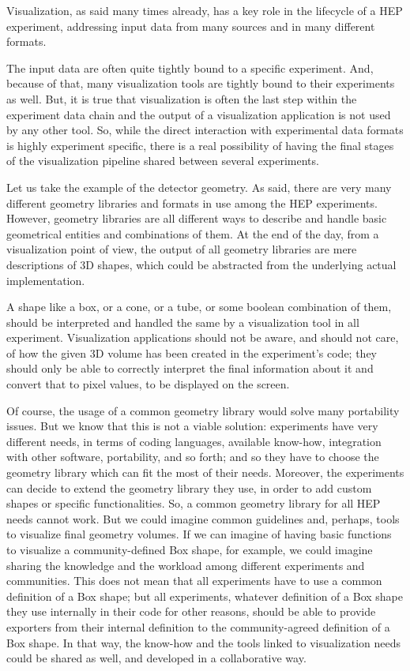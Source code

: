 \documentclass[12pt,a4paper]{article}
\begin{document}
Visualization, as said many times already, has a key role in the lifecycle of a HEP experiment, addressing input data from many sources and in many different formats.

The input data are often quite tightly bound to a specific experiment. And, because of that, many visualization tools are tightly bound to their experiments as well. But, it is true that visualization is often the last step within the experiment data chain and the output of a visualization application is not used by any other tool. So, while the direct interaction with experimental data formats is highly experiment specific, there is a real possibility of having the final stages of the visualization pipeline shared between several experiments.

Let us take the example of the detector geometry. As said, there are very many different geometry libraries and formats in use among the HEP experiments. However, geometry libraries are all different ways to describe and handle basic  geometrical entities and combinations of them. At the end of the day, from a visualization point of view, the output of all geometry libraries are mere descriptions of 3D shapes, which  could be abstracted from the underlying actual implementation.

A shape like a box, or a cone, or a tube, or some boolean combination of them, should be interpreted and handled the same by a visualization tool in all experiment. Visualization applications should not be aware, and should not care, of how  the given 3D volume has been created in the experiment’s code; they should only be able to correctly interpret the final information about it and convert that to pixel values, to be displayed on the screen.

Of course, the usage of a common geometry library would solve many portability issues. But we know that this is not a viable solution: experiments have very different needs, in terms of coding languages, available know-how, integration with other software, portability, and so forth; and so they have to choose the geometry library which can fit the most of their needs.
Moreover, the experiments can decide to extend the geometry library they use, in order to add custom shapes or specific functionalities. So, a common geometry library for all HEP needs cannot work.
But we could imagine common guidelines and, perhaps, tools to visualize final geometry volumes. If we can imagine of having basic functions to visualize a community-defined Box shape, for example, we could imagine sharing the knowledge and the workload among different experiments and communities. This does not mean that all experiments have to use a common definition
of a Box shape; but all experiments, whatever definition of a Box shape they use internally in their code for other reasons, should be able to provide exporters from their internal definition to the community-agreed definition of a Box shape.
In that way, the know-how and the tools linked to visualization needs could be shared as well, and developed in a collaborative way.
\end{document}
